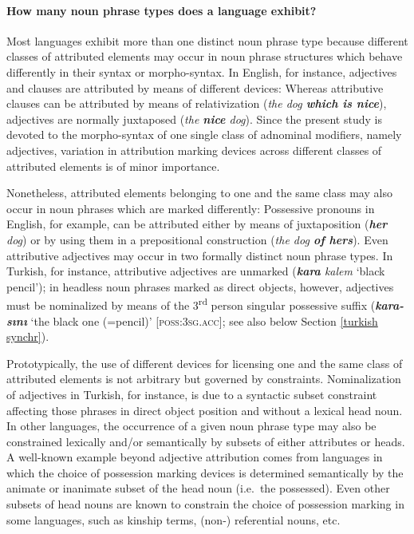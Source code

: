 \paragraph{How many noun phrase types does a language exhibit?} Most languages exhibit more than one distinct noun phrase type because different classes of attributed elements may occur in noun phrase structures which behave differently in their syntax or morpho-syntax. In English, for instance, adjectives and clauses are attributed by means of different devices: Whereas attributive clauses can be attributed by means of relativization (\textit{the dog \textbf{which is nice}}), adjectives are normally juxtaposed (\textit{the \textbf{nice} dog}). Since the present study is devoted to the morpho-syntax of one single class of adnominal modifiers, namely adjectives, variation in attribution marking devices across different classes of attributed elements is of minor importance. 

Nonetheless, attributed elements belonging to one and the same class may also occur in noun phrases which are marked differently: Possessive pronouns in English, for example, can be attributed either by means of juxtaposition (\textit{\textbf{her} dog}) or by using them in a prepositional construction (\textit{the dog \textbf{of hers}}). Even attributive adjectives may occur in two formally distinct noun phrase types. In Turkish, for instance, attributive adjectives are unmarked (\textit{\textbf{kara} kalem} ‘black pencil’); in headless noun phrases marked as direct objects, however, adjectives must be nominalized by means of the 3\textsuperscript{rd} person singular possessive suffix (\textit{\textbf{kara-sını}} ‘the black one (=pencil)’ [\textsc{poss:3sg.acc}]; see also below Section \ref{turkish synchr}). 

Prototypically, the use of different devices for licensing one and the same class of attributed elements is not arbitrary but governed by constraints. Nominalization of adjectives in Turkish, for instance, is due to a syntactic subset constraint affecting those phrases in direct object position and without a lexical head noun. In other languages, the occurrence of a given noun phrase type may also be constrained lexically and/\-or semantically by subsets of either attributes or heads. A well-known example beyond adjective attribution comes from languages in which the choice of possession marking devices is determined semantically by the animate or inanimate subset of the head noun (i.e.~the possessed). Even other subsets of head nouns are known to constrain the choice of possession marking in some languages, such as kinship terms, (non-) referential nouns, etc.

